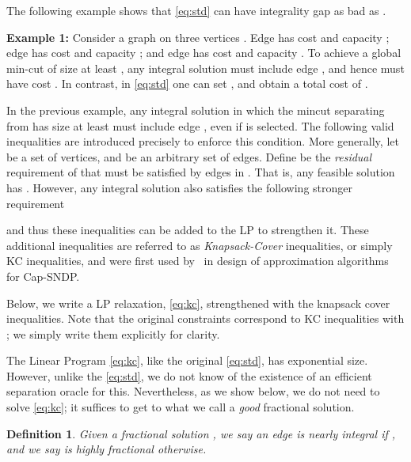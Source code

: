 \documentclass[11pt]{article}
\newcounter{thm0Rcopies}
\newcounter{thm_saved}
\newtheorem{definition}[lemma]{Definition}
\newenvironment{note}[1]{\medskip\noindent \textbf{#1:}}{\medskip}
\def\stdLP{\eqref{eq:std}\xspace}
\def\KCLP{\eqref{eq:kc}\xspace}
\begin{document}
\iffalse
Athough \stdLP has exponential size, one can write a polynomial-sized
flow-based relaxation that is essentially equivalent. Unfortunately,
as the example below shows, the LP can have an unbounded integrality
gap.
\fi
The following example shows that \stdLP can have integrality gap as bad as .

\begin{note}{Example 1}
  Consider a graph  on three vertices . Edge  has cost
   and capacity ; edge  has cost  and capacity ; and
  edge  has cost  and capacity . To achieve a global min-cut
  of size at least , any integral solution must include edge ,
  and hence must have cost . In contrast, in \stdLP one can set
  , and obtain a total cost of .
\end{note}

In the previous example, any integral solution in which the mincut
separating  from  has size at least  must include edge
, even if  is selected. The following valid inequalities are
introduced precisely to enforce this condition. More generally, let
 be a set of vertices, and  be an arbitrary set of edges. Define
 be the \emph{residual}
requirement of  that must be satisfied by edges in
. That is, any feasible solution has . However, any
integral solution also satisfies the following stronger requirement

and thus these inequalities can be added to the LP to strengthen it.
These additional inequalities are referred to as \emph{Knapsack-Cover}
inequalities, or simply KC inequalities, and were first used
by~\cite{CFLP} in design of approximation algorithms for Cap-SNDP.




Below, we write a LP relaxation, \KCLP, strengthened with the knapsack
cover inequalities. Note that the original constraints correspond to
KC inequalities with ; we simply write them explicitly
for clarity.

\vspace{-5mm}




\noindent
The Linear Program \KCLP, like the original \stdLP, has exponential
size. However, unlike the \stdLP, we do not know of the existence of
an efficient separation oracle for this. Nevertheless, as we show
below, we do not need to solve \KCLP; it suffices to get to what we
call a {\em good} fractional solution. 



\begin{definition}
  Given a fractional solution , we say an edge  is
  {\em nearly integral} if , and
  we say  is {\em highly fractional} otherwise.
\end{definition}
\end{document}
